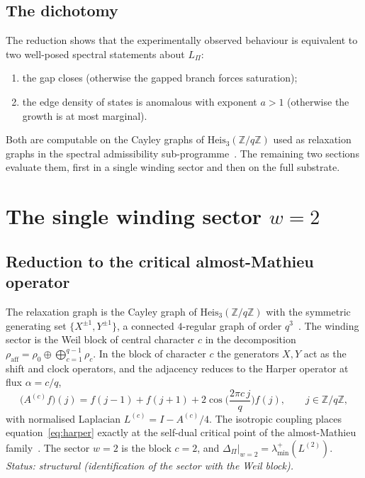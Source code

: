 \documentclass[11pt]{article}
\newcommand{\Heis}{\mathrm{Heis}_3(\mathbb{Z}/q\mathbb{Z})}
\newcommand{\DPi}{\Delta_\Pi}
\newcommand{\Lap}{L_\Pi}
\begin{document}
\subsection{The dichotomy}

The reduction shows that the experimentally observed behaviour is equivalent to two well-posed spectral statements
about $\Lap$:
\begin{enumerate}
\item the gap closes (otherwise the gapped branch forces saturation);
\item the edge density of states is anomalous with exponent $a>1$ (otherwise the growth is at most marginal).
\end{enumerate}
Both are computable on the Cayley graphs of $\Heis$ used as relaxation graphs in the spectral admissibility
sub-programme~\cite{Beau2026a13, Beau2026a1note}.
The remaining two sections evaluate them, first in a single winding sector and then on the full substrate.

\section{The single winding sector \texorpdfstring{$w=2$}{w=2}}
\label{sec:w2}

\subsection{Reduction to the critical almost-Mathieu operator}

The relaxation graph is the Cayley graph of $\Heis$ with the symmetric generating set $\{X^{\pm 1}, Y^{\pm 1}\}$,
a connected $4$-regular graph of order $q^3$~\cite{Beau2026a13}.
The winding sector is the Weil block of central character $c$ in the decomposition
$\rho_{\mathrm{aff}}=\rho_0\oplus\bigoplus_{c=1}^{q-1}\rho_c$.
In the block of character $c$ the generators $X,Y$ act as the shift and clock operators, and the adjacency reduces
to the Harper operator at flux $\alpha=c/q$,
\begin{equation}
\big(A^{(c)}f\big)(j) = f(j-1)+f(j+1)+2\cos\!\Big(\frac{2\pi c\,j}{q}\Big)f(j), \qquad j\in\mathbb{Z}/q\mathbb{Z},
\label{eq:harper}
\end{equation}
with normalised Laplacian $L^{(c)}=I-A^{(c)}/4$.
The isotropic coupling places equation~\eqref{eq:harper} exactly at the self-dual critical point of the
almost-Mathieu family~\cite{Hofstadter1976}.
The sector $w=2$ is the block $c=2$, and $\DPi|_{w=2}=\lambda_{\min}^{+}(L^{(2)})$.
\emph{Status: structural (identification of the sector with the Weil block).}
\end{document}
